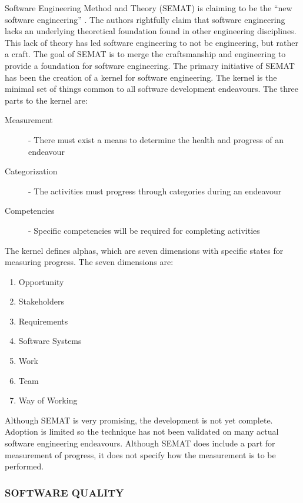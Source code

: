 \documentclass[SDSUThesis.tex]{subfiles}
\begin{document}
    Software Engineering Method and Theory (SEMAT) is claiming to 
    be the ``new software engineering'' 
    \cite{Jacobson2014}.  The authors rightfully claim that 
    software engineering lacks
    an underlying theoretical foundation found in other 
    engineering disciplines.  This lack of theory
    has led software engineering to not be engineering, but 
    rather a craft.  The goal of 
    SEMAT is to merge the craftsmanship and engineering to 
    provide a foundation for software
    engineering.  The primary initiative of SEMAT 
    has been the creation of a kernel for 
    software engineering.  The kernel is the minimal set 
    of things common to all software development
    endeavours. The three parts to the kernel are:
    \begin{description}
        \item[Measurement] - There must exist a means to 
            determine the health and progress of an endeavour
        \item[Categorization]-  The activities must progress 
            through categories during an endeavour
        \item[Competencies] - Specific competencies will 
            be required for completing activities
    \end{description}
    
    The kernel defines alphas, which are seven dimensions with
    specific states for measuring progress. 
    The seven dimensions are: 
    \begin{enumerate}
        \item Opportunity
        \item Stakeholders
        \item Requirements
        \item Software Systems
        \item Work
        \item Team
        \item Way of Working
    \end{enumerate}
    
    Although SEMAT is very promising, the development is not yet complete.  Adoption is
    limited so the technique has not been validated on many
    actual software engineering endeavours.  Although SEMAT does include a part for
    measurement of progress, it does not specify how the measurement is to be 
    performed.

\subsubsection{SOFTWARE QUALITY}
\end{document}
